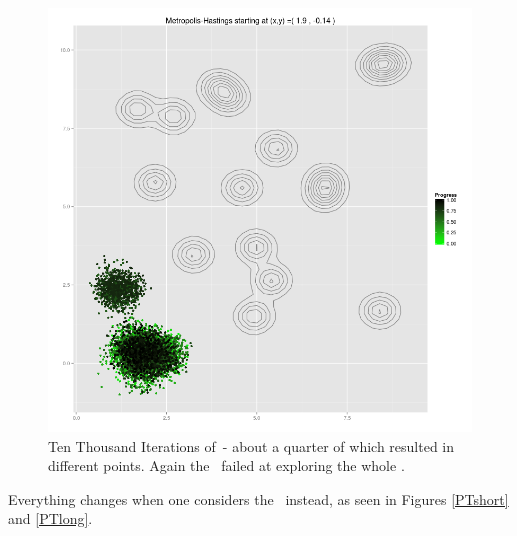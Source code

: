 \begin{figure}[ht]
	\centering 
	\includegraphics[width=\textwidth,keepaspectratio]{./img/MH_simululation_10000_steps.png}
	\caption[]{Ten Thousand Iterations of \MH\,- about a quarter of which resulted in different points. Again the \MH\, failed at exploring the whole \sspace.}\label{unexploredLong}
\end{figure}

Everything changes when one considers the \PT\, instead, as seen in Figures \ref{PTshort} and \ref{PTlong}.

